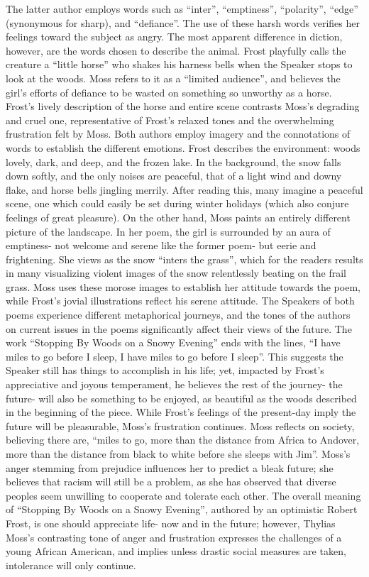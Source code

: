 \documentclass[12pt]{book}
\renewcommand{\indent}{\hspace{1cm}}
\begin{document}
\begin{spacing}{2}
\begin{linenumbers*}
\indent The latter author employs words such as “inter”, “emptiness”, “polarity”, “edge” (synonymous for sharp), and “defiance”. The use of these harsh words verifies her feelings toward the subject as angry. The most apparent difference in diction, however, are the words chosen to describe the animal. Frost playfully calls the creature a “little horse” who shakes his harness bells when the Speaker stops to look at the woods. Moss refers to it as a “limited audience”, and believes the girl's efforts of defiance to be wasted on something so unworthy as a horse. Frost's lively description of the horse and entire scene contrasts Moss's degrading and cruel one, representative of Frost's relaxed tones and the overwhelming frustration felt by Moss. Both authors employ imagery and the connotations of words to establish the different emotions. Frost describes the environment: woods lovely, dark, and deep, and the frozen lake. In the background, the snow falls down softly, and the only noises are peaceful, that of a light wind and downy flake, and horse bells jingling merrily. After reading this, many imagine a peaceful scene, one which could easily be set during winter holidays (which also conjure feelings of great pleasure). On the other hand, Moss paints an entirely different picture of the landscape. In her poem, the girl is surrounded by an aura of emptiness- not welcome and serene like the former poem- but eerie and frightening. She views as the snow “inters the grass”, which for the readers results in many visualizing violent images of the snow relentlessly beating on the frail grass. Moss uses these morose images to establish her attitude towards the poem, while Frost's jovial illustrations reflect his serene attitude. The Speakers of both poems experience different metaphorical journeys, and the tones of the authors on current issues in the poems significantly affect their views of the future. The work “Stopping By Woods on a Snowy Evening” ends with the lines, “I have miles to go before I sleep, I have miles to go before I sleep”. This suggests the Speaker still has things to accomplish in his life; yet, impacted by Frost's appreciative and joyous temperament, he believes the rest of the journey- the future- will also be something to be enjoyed, as beautiful as the woods described in the beginning of the piece. While Frost's feelings of the present-day imply the future will be pleasurable, Moss's frustration continues. Moss reflects on society, believing there are, “miles to go, more than the distance from Africa to Andover, more than the distance from black to white before she sleeps with Jim”. Moss's anger stemming from prejudice influences her to predict a bleak future; she believes that racism will still be a problem, as she has observed that diverse peoples seem unwilling to cooperate and tolerate each other. The overall meaning of “Stopping By Woods on a Snowy Evening”, authored by an optimistic Robert Frost, is one should appreciate life- now and in the future; however, Thylias Moss's contrasting tone of anger and frustration expresses the challenges of a young African American, and implies unless drastic social measures are taken, intolerance will only continue.     

\end{linenumbers*}
\end{spacing}
\end{document}
